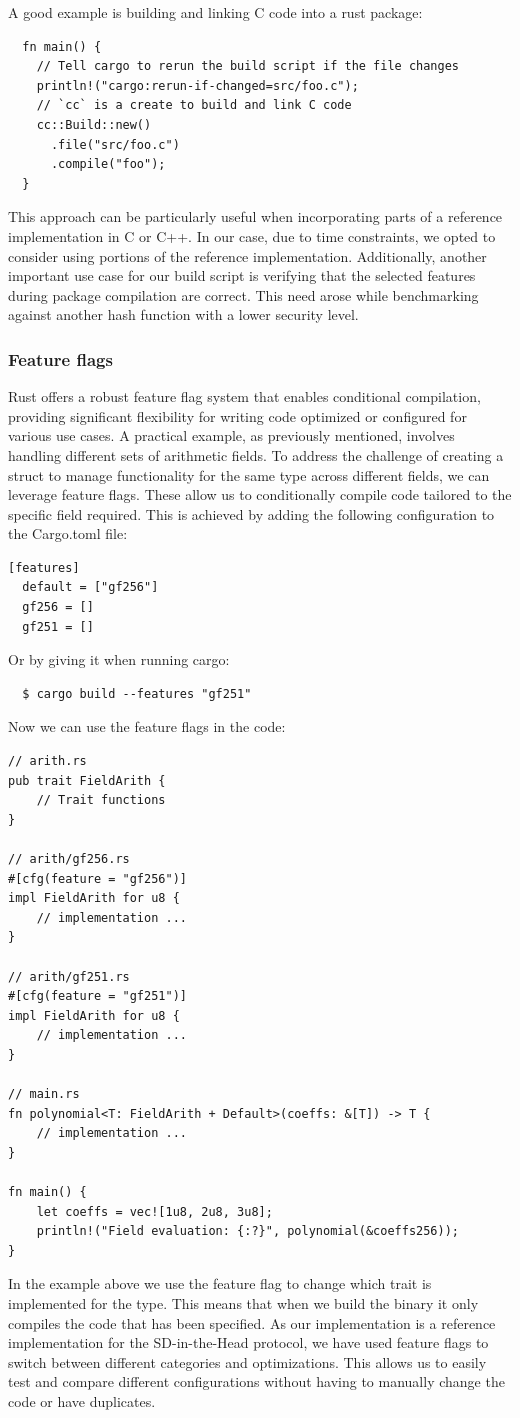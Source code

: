 \documentclass[11pt]{report}
\theoremstyle{definition}
\theoremstyle{plain}
\begin{document}
A good example is building and linking C code into a rust package:
\begin{verbatim}
  fn main() {
    // Tell cargo to rerun the build script if the file changes
    println!("cargo:rerun-if-changed=src/foo.c");
    // `cc` is a create to build and link C code
    cc::Build::new()
      .file("src/foo.c")
      .compile("foo");
  }
\end{verbatim}
This approach can be particularly useful when incorporating parts of a reference implementation in C or C++. In our case, due to time constraints, we opted to consider using portions of the reference implementation. Additionally, another important use case for our build script is verifying that the selected features during package compilation are correct. This need arose while benchmarking against another hash function with a lower security level.

\subsubsection{Feature flags}
Rust offers a robust feature flag system that enables conditional compilation, providing significant flexibility for writing code optimized or configured for various use cases.
A practical example, as previously mentioned, involves handling different sets of arithmetic fields. To address the challenge of creating a struct to manage functionality for the same type across different fields, we can leverage feature flags. These allow us to conditionally compile code tailored to the specific field required. This is achieved by adding the following configuration to the Cargo.toml file:
\begin{verbatim}
[features]
  default = ["gf256"]
  gf256 = []
  gf251 = []
\end{verbatim}
Or by giving it when running cargo:
\begin{verbatim}
  $ cargo build --features "gf251"
\end{verbatim}
Now we can use the feature flags in the code:
\begin{verbatim}
// arith.rs
pub trait FieldArith {
    // Trait functions
}

// arith/gf256.rs
#[cfg(feature = "gf256")]
impl FieldArith for u8 {
    // implementation ...
}

// arith/gf251.rs
#[cfg(feature = "gf251")]
impl FieldArith for u8 {
    // implementation ...
}

// main.rs
fn polynomial<T: FieldArith + Default>(coeffs: &[T]) -> T {
    // implementation ...
}

fn main() {
    let coeffs = vec![1u8, 2u8, 3u8];
    println!("Field evaluation: {:?}", polynomial(&coeffs256));
}
\end{verbatim}
In the example above we use the feature flag to change which trait is implemented for the  type. This means that when we build the binary it only compiles the code that has been specified.
As our implementation is a reference implementation for the SD-in-the-Head protocol, we have used feature flags to switch between different categories and optimizations. This allows us to easily test and compare different configurations without having to manually change the code or have duplicates.
\end{document}
